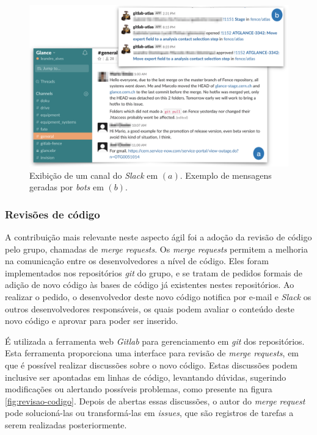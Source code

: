 \begin{figure}[H]
    \centering
    \includegraphics[width=15cm]{source/4-solucao/images/slack-example.png}
    \caption{Exibição de um canal do \emph{Slack} em $(a)$. Exemplo de mensagens geradas por \emph{bots} em $(b)$. }
    \label{fig:slack-example}
\end{figure}

\hypertarget{revisoes-de-codigo}{%
\subsubsection{Revisões de código}\label{revisoes-de-codigo}}

A contribuição mais relevante neste aspecto ágil foi a adoção da revisão de código pelo grupo, chamadas de \emph{merge requests}. Os \emph{merge requests} permitem a melhoria na comunicação entre os desenvolvedores a nível de código. Eles foram implementados nos repositórios \emph{git} do grupo, e se tratam de pedidos formais de adição de novo código às bases de código já existentes nestes repositórios. Ao realizar o pedido, o desenvolvedor deste novo código notifica por e-mail e \emph{Slack} os outros desenvolvedores responsáveis, os quais podem avaliar o conteúdo deste novo código e aprovar para poder ser inserido.

É utilizada a ferramenta web \emph{Gitlab} para gerenciamento em \emph{git} dos repositórios. Esta ferramenta proporciona uma interface para revisão de \emph{merge requests}, em que é possível realizar discussões sobre o novo código. Estas discussões podem inclusive ser apontadas em linhas de código, levantando dúvidas, sugerindo modificações ou alertando possíveis problemas, como presente na figura \ref{fig:revisao-codigo}. Depois de abertas essas discussões, o autor do \emph{merge request} pode solucioná-las ou transformá-las em \emph{issues}, que são registros de tarefas a serem realizadas posteriormente.

